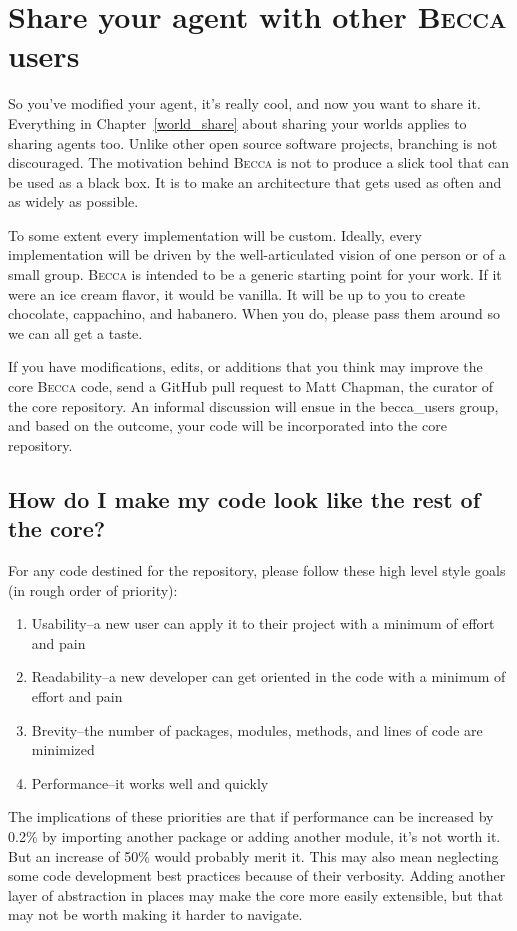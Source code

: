 \chapter{Share your agent with other \textsc{Becca} users}

So you've modified your agent, it's really cool, and now you want to share it. Everything in Chapter~\ref{world_share} about sharing your worlds applies to sharing agents too. Unlike other open source software projects, branching is not discouraged. The motivation behind \textsc{Becca} is not to produce a slick tool that can be used as a black box. It is to make an architecture that gets used as often and as widely as possible. 

To some extent every implementation will be custom. Ideally, every implementation will be driven by the well-articulated vision of one person or of a small group. \textsc{Becca} is intended to be a generic starting point for your work. If it were an ice cream flavor, it would be vanilla. It will be up to you to create chocolate, cappachino, and habanero. When you do, please pass them around so we can all get a taste.

If you have modifications, edits, or additions that you think may improve the core \textsc{Becca} code, send a GitHub pull request to Matt Chapman, the curator of the core repository. An informal discussion will ensue in the becca\_users group, and based on the outcome, your code will be incorporated into the core repository.

\section{How do I make my code look like the rest of the core?}
For any code destined for the repository, please follow these high level style goals (in rough order of priority):
\begin{enumerate}
\item Usability--a new user can apply it to their project with a minimum
of effort and pain
\item Readability--a new developer can get oriented in the code with a
minimum of effort and pain
\item Brevity--the number of packages, modules, methods, and lines of
code are minimized
\item Performance--it works well and quickly
\end{enumerate}

The implications of these priorities are that if performance can be increased by 0.2\% by importing another
package or adding another module, it's not worth it. But an
increase of 50\% would probably merit it. This may also mean neglecting
some code development best practices because of their verbosity.
Adding another layer of abstraction in places may make the core more
easily extensible, but that may not be worth making it harder to
navigate.

